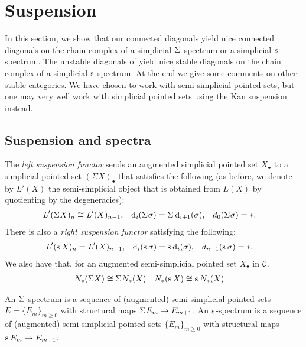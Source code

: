 
\section{Suspension}\label{s:suspension}


In this section, we show that our connected diagonals yield nice connected diagonals on the chain complex of a simplicial $\Sigma^{}$-spectrum or a simplicial $\operatorname{s}^{}$-spectrum. The unstable diagonals of \cite{medina2021may_st} yield nice stable diagonals on the chain complex of a simplicial $\operatorname{s}^{}$-spectrum. At the end we give some comments on other stable categories. We have chosen to work with semi-simplicial pointed sets, but one may very well work with simplicial pointed sets using the Kan suspension instead.


\subsection{Suspension and spectra} The \emph{left suspension functor} sends an augmented simplicial pointed set $X_\bullet$ to a simplicial pointed set $(\Sigma X)_\bullet$ that satisfies the following (as before, we denote by $L'(X)$ the semi-simplicial object that is obtained from $L(X)$ by quotienting by the degeneracies):
\begin{align*}
 \operatorname{{\it L}}'(\Sigma^{} X)_n &\cong \operatorname{{\it L}}'(X)_{n-1},& \operatorname{d}_i(\Sigma^{}\sigma) &= \Sigma^{} \operatorname{d}_{i+1}(\sigma),& d_{0}(\Sigma^{}\sigma) &= *.
\end{align*}
There is also a \emph{right suspension functor} satisfying the following:
\begin{align*}
 \operatorname{{\it L}}'(\operatorname{s}^{} X)_n &= \operatorname{{\it L}}'(X)_{n-1}, &\operatorname{d}_i(\operatorname{s}^{}\sigma) &= \operatorname{s}^{} \operatorname{d}_i(\sigma),& d_{n+1}(\operatorname{s}^{} \sigma) &= *.
\end{align*}
We also have that, for an augmented semi-simplicial pointed set $X_\bullet$ in $\mathcal{C}$,
\begin{align*}
 N_{*}(\Sigma X)&\cong \Sigma^{} N_{*}(X) & N_{*}(\operatorname{s}^{}X) &\cong \operatorname{s}^{}N_{*}(X)
\end{align*}

An $\Sigma^{}$-spectrum is a sequence of (augmented) semi-simplicial pointed sets $E = \{E_m\}_{m \geq 0}$ with structural maps $\Sigma^{} E_m \to E_{m+1}$. An $\operatorname{s}^{}$-spectrum is a sequence of (augmented) semi-simplicial pointed sets $\{E_m\}_{m \geq 0}$ with structural maps $\operatorname{s}^{} E_m \to E_{m+1}$.

